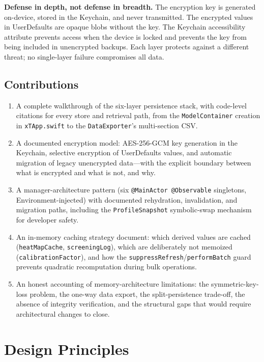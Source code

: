 \documentclass[11pt,a4paper]{article}
\newcommand{\code}[1]{\texttt{\small #1}}
\begin{document}
\textbf{Defense in depth, not defense in breadth.} The encryption key is
generated on-device, stored in the Keychain, and never transmitted. The
encrypted values in UserDefaults are opaque blobs without the key. The
Keychain accessibility attribute prevents access when the device is locked
and prevents the key from being included in unencrypted backups. Each layer
protects against a different threat; no single-layer failure compromises all
data.

\subsection{Contributions}
\label{sec:contributions}

\begin{enumerate}[nosep,leftmargin=1.4em]
\item A complete walkthrough of the six-layer persistence stack, with
  code-level citations for every store and retrieval path, from the
  \code{ModelContainer} creation in \code{xTApp.swift} to the
  \code{DataExporter}'s multi-section CSV.
\item A documented encryption model: AES-256-GCM key generation in the
  Keychain, selective encryption of UserDefaults values, and automatic
  migration of legacy unencrypted data---with the explicit boundary between
  what is encrypted and what is not, and why.
\item A manager-architecture pattern (six \code{@MainActor @Observable}
  singletons, Environment-injected) with documented rehydration,
  invalidation, and migration paths, including the \code{ProfileSnapshot}
  symbolic-swap mechanism for developer safety.
\item An in-memory caching strategy document: which derived values are
  cached (\code{heatMapCache}, \code{screeningLog}), which are deliberately
  not memoized (\code{calibrationFactor}), and how the
  \code{suppressRefresh}/\code{performBatch} guard prevents quadratic
  recomputation during bulk operations.
\item An honest accounting of memory-architecture limitations: the
  symmetric-key-loss problem, the one-way data export, the split-persistence
  trade-off, the absence of integrity verification, and the structural gaps
  that would require architectural changes to close.
\end{enumerate}

\section{Design Principles}
\label{sec:principles}
\end{document}
